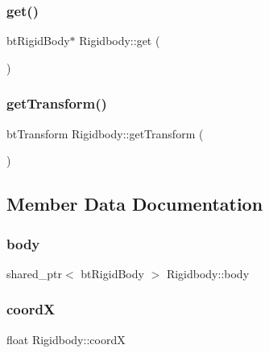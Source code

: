 \subsubsection{\texorpdfstring{get()}{get()}}
{\footnotesize\ttfamily bt\+Rigid\+Body$\ast$ Rigidbody\+::get (\begin{DoxyParamCaption}{ }\end{DoxyParamCaption})\hspace{0.3cm}{\ttfamily [inline]}}

\mbox{\label{class_rigidbody_a4e63ac1ae27de4b0c84e6a3956fc0edd}} 
\subsubsection{\texorpdfstring{get\+Transform()}{getTransform()}}
{\footnotesize\ttfamily bt\+Transform Rigidbody\+::get\+Transform (\begin{DoxyParamCaption}{ }\end{DoxyParamCaption})\hspace{0.3cm}{\ttfamily [inline]}}



\subsection{Member Data Documentation}
\mbox{\label{class_rigidbody_adc3e81959384b3b97c786805592a36c3}} 
\subsubsection{\texorpdfstring{body}{body}}
{\footnotesize\ttfamily shared\+\_\+ptr$<$ bt\+Rigid\+Body $>$ Rigidbody\+::body\hspace{0.3cm}{\ttfamily [protected]}}

\mbox{\label{class_rigidbody_abe7f1cec1c81ff1c0544cdb49ca8cded}} 
\subsubsection{\texorpdfstring{coordX}{coordX}}
{\footnotesize\ttfamily float Rigidbody\+::coordX\hspace{0.3cm}{\ttfamily [protected]}}

